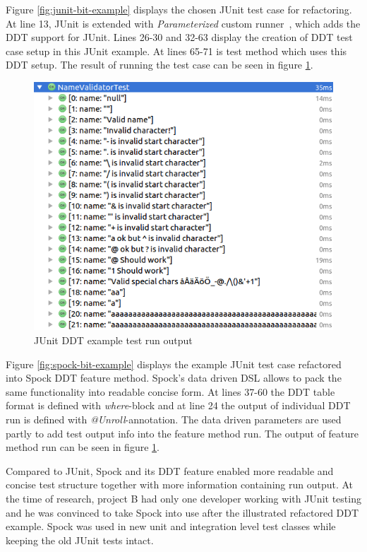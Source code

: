     Figure \ref{fig:junit-bit-example} displays the chosen JUnit test case for refactoring. At line 13, JUnit is extended with
    \textit{Parameterized} custom runner~\cite{junit-parameterized}, which adds the DDT support for JUnit.
    Lines 26-30 and 32-63 display the creation
    of DDT test case setup in this JUnit example. At lines 65-71 is test method which uses this DDT setup. The result of running
    the test case can be seen in figure \ref{fig:junit-bit-results}.

    \begin{figure}[H]
      \begin{center}
        \includegraphics[width=11.7cm]{images/junit-validator-results.png}
        \caption{JUnit DDT example test run output}
        \label{fig:junit-bit-results}
      \end{center}
    \end{figure}

    Figure \ref{fig:spock-bit-example} displays the example JUnit test case refactored into Spock DDT feature method. Spock's
    data driven DSL allows to pack the same functionality into readable concise form.  At lines 37-60 the DDT table format
    is defined with \textit{where}-block and at line 24 the output of individual DDT run is defined with \textit{@Unroll}-annotation.
    The data driven parameters are used partly
    to add test output info into the feature method run. The output of feature method run can
    be seen in figure \ref{fig:junit-bit-results}.

    Compared to JUnit, Spock and its DDT feature enabled more readable and concise test structure together with more information
    containing run output. At the time of research, project B had only one developer working with JUnit testing and
    he was convinced to take Spock into use after the illustrated refactored DDT example. Spock was used in new unit and
    integration level test classes while keeping the old JUnit tests intact.

